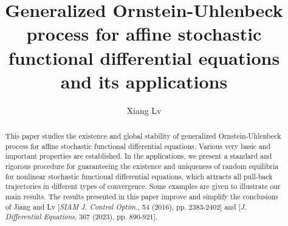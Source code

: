 \documentclass[preprint,12pt]{elsarticle}
\begin{document}
\begin{frontmatter}



\title{Generalized Ornstein-Uhlenbeck process for affine
stochastic functional differential equations and its applications}
\author{Xiang Lv}

\address{Department of Mathematics, Shanghai Normal
University, Shanghai 200234, People's Republic of China}
\begin{abstract}
This paper studies the existence and global stability of generalized Ornstein-Uhlenbeck process for affine stochastic functional differential equations.  Various very basic and important properties are established. In the applications, we present a standard and rigorous procedure for guaranteeing the existence and uniqueness of random equilibria for nonlinear stochastic functional differential equations, which attracts all pull-back trajectories in different types of convergence. Some examples are given to illustrate our main results. The results presented in this paper improve and simplify the conclusions of Jiang and Lv [{\it SIAM J. Control Optim.}, 54 (2016), pp. 2383-2402] and [{\it J. Differential Equations}, 367 (2023), pp. 890-921].
\end{abstract}


\end{frontmatter}
\end{document}
